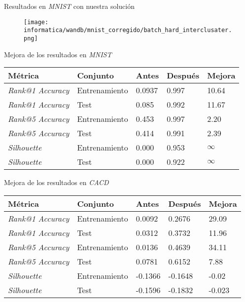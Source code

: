 \begin{frame}{Resultados en \textit{MNIST} con nuestra solución}


	\begin{figure}
		\texttt{[image: informatica/wandb/mnist\_corregido/batch\_hard\_interclusater.png]}
	\end{figure}


\end{frame}

\begin{frame}{Mejora de los resultados en \textit{MNIST}}


	\begin{table}
		\centering
		\begin{tabular}{|l|l|l|l|l|}
			\hline
			Métrica                  & Conjunto      & Antes  & Después & Mejora   \\
			\hline
			\textit{Rank@1 Accuracy} & Entrenamiento & 0.0937 & 0.997   & 10.64    \\
			\textit{Rank@1 Accuracy} & Test          & 0.085  & 0.992   & 11.67    \\
			\textit{Rank@5 Accuracy} & Entrenamiento & 0.453  & 0.997   & 2.20     \\
			\textit{Rank@5 Accuracy} & Test          & 0.414  & 0.991   & 2.39     \\
			\textit{Silhouette}      & Entrenamiento & 0.000  & 0.953   & $\infty$ \\
			\textit{Silhouette}      & Test          & 0.000  & 0.922   & $\infty$ \\
			\hline
		\end{tabular}
		\label{table:comparaciones_mnist_resultados}
	\end{table}
\end{frame}

\begin{frame}{Mejora de los resultados en \textit{CACD}}

	\begin{table}
		\centering
		\begin{tabular}{|l|l|l|l|l|}
			\hline
			Métrica                  & Conjunto      & Antes   & Después & Mejora \\
			\hline
			\textit{Rank@1 Accuracy} & Entrenamiento & 0.0092  & 0.2676  & 29.09  \\
			\textit{Rank@1 Accuracy} & Test          & 0.0312  & 0.3732  & 11.96  \\
			\textit{Rank@5 Accuracy} & Entrenamiento & 0.0136  & 0.4639  & 34.11  \\
			\textit{Rank@5 Accuracy} & Test          & 0.0781  & 0.6152  & 7.88   \\
			\textit{Silhouette}      & Entrenamiento & -0.1366 & -0.1648 & -0.02  \\
			\textit{Silhouette}      & Test          & -0.1596 & -0.1832 & -0.023 \\
			\hline
		\end{tabular}
		\label{table:comparaciones_cacd_resultados}
	\end{table}


\end{frame}

